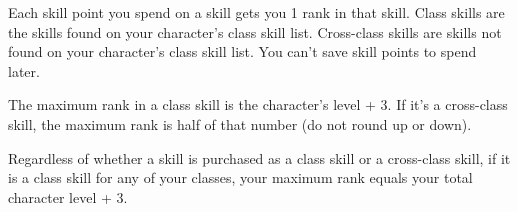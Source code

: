 Each skill point you spend on a skill gets you 1 rank in that skill. Class skills are the skills found on your character's class skill list. Cross-class skills are skills not found on your character's class skill list. You can't save skill points to spend later.

The maximum rank in a class skill is the character's level + 3. If it's a cross-class skill, the maximum rank is half of that number (do not round up or down).

Regardless of whether a skill is purchased as a class skill or a cross-class skill, if it is a class skill for any of your classes, your maximum rank equals your total  character level + 3.